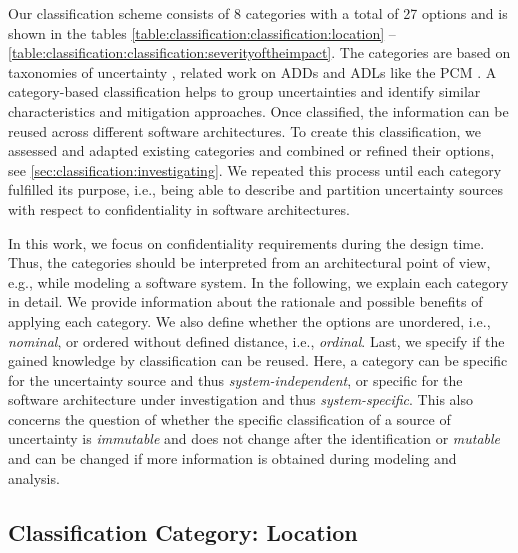 Our classification scheme consists of 8 categories with a total of 27 options and is shown in the tables \ref{table:classification:classification:location} -- \ref{table:classification:classification:severityoftheimpact}.
The categories are based on taxonomies of uncertainty \cite{bures_capturing_2020,esfahani_uncertainty_2013,mahdavi-hezavehi_classification_2017,perez-palacin_uncertainties_2014,ramirez_taxonomy_2012,walker_defining_2003,PSUM}, related work on \acp{ADD} \cite{jansen_software_2005,kruchten_ontology_2004} and \acp{ADL} like the \ac{PCM} \cite{reussner_modeling_2016}.
A category-based classification helps to group uncertainties and identify similar characteristics and mitigation approaches.
Once classified, the information can be reused across different software architectures.
To create this classification, we assessed and adapted existing categories and combined or refined their options, see \autoref{sec:classification:investigating}.
We repeated this process until each category fulfilled its purpose, i.e., being able to describe and partition uncertainty sources with respect to confidentiality in software architectures.

In this work, we focus on confidentiality requirements during the design time. 
Thus, the categories should be interpreted from an architectural point of view, e.g., while modeling a software system. 
In the following, we explain each category in detail.
We provide information about the rationale and possible benefits of applying each category.
We also define whether the options are unordered, i.e., \emph{nominal}, or ordered without defined distance, i.e., \emph{ordinal}.
Last, we specify if the gained knowledge by classification can be reused.
Here, a category can be specific for the uncertainty source and thus \emph{system-independent}, or specific for the software architecture under investigation and thus \emph{system-specific}.
This also concerns the question of whether the specific classification of a source of uncertainty is \emph{immutable} and does not change after the identification or \emph{mutable} and can be changed if more information is obtained during modeling and analysis.


\subsection{Classification Category: Location}


